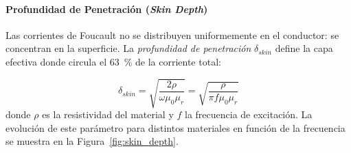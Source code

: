 \paragraph{Profundidad de Penetración (\textit{Skin Depth})}

Las corrientes de Foucault no se distribuyen uniformemente en el conductor: se concentran en la superficie. La \emph{profundidad de penetración} $\delta_{skin}$ define la capa efectiva donde circula el \qty{63}{\%} de la corriente total:

\begin{equation}\label{eq:skin_depth}
    \delta_{skin} = \sqrt{\frac{2\rho}{\omega \mu_0 \mu_r}} = \sqrt{\frac{\rho}{\pi f \mu_0 \mu_r}}
\end{equation}
%
donde $\rho$ es la resistividad del material y $f$ la frecuencia de excitación. La evolución de este parámetro para distintos materiales en función de la frecuencia se muestra en la Figura~\ref{fig:skin_depth}.


